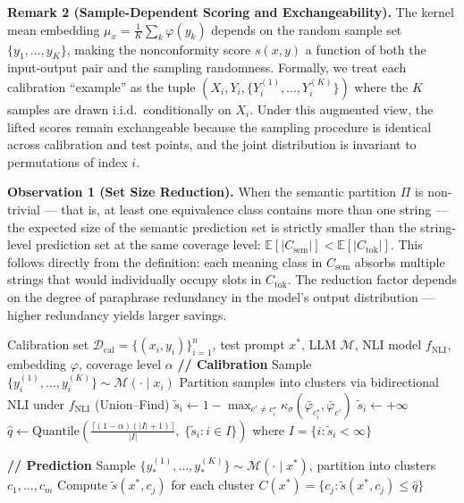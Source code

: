 \documentclass{article}
\begin{document}
\textbf{Remark 2 (Sample-Dependent Scoring and Exchangeability).} The kernel mean embedding $\mu_x = \frac{1}{K}\sum_k \varphi(y_k)$ depends on the random sample set $\{y_1, \ldots, y_K\}$, making the nonconformity score $s(x, y)$ a function of both the input-output pair and the sampling randomness. Formally, we treat each calibration ``example'' as the tuple $(X_i, Y_i, \{Y_i^{(1)}, \ldots, Y_i^{(K)}\})$ where the $K$ samples are drawn i.i.d.\ conditionally on $X_i$. Under this augmented view, the lifted scores remain exchangeable because the sampling procedure is identical across calibration and test points, and the joint distribution is invariant to permutations of index $i$.

\textbf{Observation 1 (Set Size Reduction).} When the semantic partition $\Pi$ is non-trivial --- that is, at least one equivalence class contains more than one string --- the expected size of the semantic prediction set is strictly smaller than the string-level prediction set at the same coverage level: $\mathbb{E}[|C_{\text{sem}}|] < \mathbb{E}[|C_{\text{tok}}|]$. This follows directly from the definition: each meaning class in $C_{\text{sem}}$ absorbs multiple strings that would individually occupy slots in $C_{\text{tok}}$. The reduction factor depends on the degree of paraphrase redundancy in the model's output distribution --- higher redundancy yields larger savings.

\begin{algorithm}[t]
\caption{SemCP --- Semantic Conformal Prediction}
\label{alg:semcp}
\begin{algorithmic}[1]
\REQUIRE Calibration set $\mathcal{D}_{\text{cal}} = \{(x_i, y_i)\}_{i=1}^n$, test prompt $x^*$, LLM $\mathcal{M}$, NLI model $f_{\text{NLI}}$, embedding $\varphi$, coverage level $\alpha$
\STATE \textbf{// Calibration}
  \STATE Sample $\{y_i^{(1)}, \ldots, y_i^{(K)}\} \sim \mathcal{M}(\cdot \mid x_i)$
  \STATE Partition samples into clusters via bidirectional NLI under $f_{\text{NLI}}$ (Union--Find)
    \STATE $\tilde{s}_i \gets 1 - \max_{c' \neq c_i^\star} \kappa_\sigma(\bar\varphi_{c_i^\star}, \bar\varphi_{c'})$ \quad{}
  \ELSE
    \STATE $\tilde{s}_i \gets +\infty$ \quad{}
  \ENDIF
\ENDFOR
\STATE $\hat{q} \gets \mathrm{Quantile}\!\left(\frac{\lceil(1 - \alpha)(|I|+1)\rceil}{|I|},\; \{\tilde{s}_i : i \in I\}\right)$ where $I = \{i : \tilde{s}_i < \infty\}$

\STATE \textbf{// Prediction}
\STATE Sample $\{y_*^{(1)}, \ldots, y_*^{(K)}\} \sim \mathcal{M}(\cdot \mid x^*)$, partition into clusters $c_1, \ldots, c_m$
\STATE Compute $\tilde{s}(x^*, c_j)$ for each cluster
\RETURN $C(x^*) = \{c_j : \tilde{s}(x^*, c_j) \le \hat{q}\}$
\end{algorithmic}
\end{algorithm}
\end{document}
